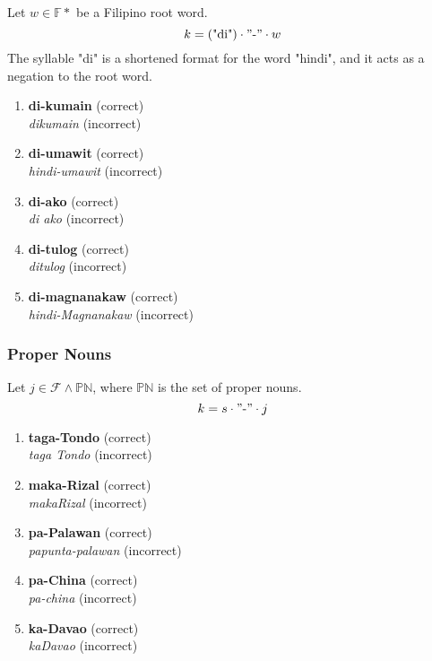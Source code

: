 Let \(w \in \mathbb{F}*\) be a Filipino root word.
\[
      k = (\text{"di"}) \cdot "\text{-}" \cdot w
\]
The syllable "di" is a shortened format for the word "hindi", and it acts as a negation to the root word.
\begin{example}
\end{example}
\begin{enumerate}
      \item \textbf{di-kumain} (correct) \\
            \textit{dikumain} (incorrect)
      \item \textbf{di-umawit} (correct) \\
            \textit{hindi-umawit} (incorrect)
      \item \textbf{di-ako} (correct) \\
            \textit{di ako} (incorrect)
      \item \textbf{di-tulog} (correct) \\
            \textit{ditulog} (incorrect)
      \item \textbf{di-magnanakaw} (correct) \\
            \textit{hindi-Magnanakaw} (incorrect)
\end{enumerate}

\subsubsection{Proper Nouns}
\label{proper_nouns_chapter}
Let \(j \in \mathcal{F} \wedge \mathbb{PN}\), where \(\mathbb{PN}\) is the set of proper nouns.
\[
      k = s \cdot "\text{-}" \cdot j
\]
\begin{example}
\end{example}
\begin{enumerate}
      \item \textbf{taga-Tondo} (correct) \\
            \textit{taga Tondo} (incorrect)
      \item \textbf{maka-Rizal} (correct) \\
            \textit{makaRizal} (incorrect)
      \item \textbf{pa-Palawan} (correct) \\
            \textit{papunta-palawan} (incorrect)
      \item \textbf{pa-China} (correct) \\
            \textit{pa-china} (incorrect)
      \item \textbf{ka-Davao} (correct) \\
            \textit{kaDavao} (incorrect)
\end{enumerate}

